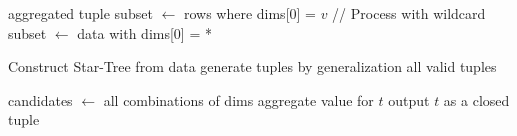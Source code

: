 \usepackage{algorithm}
\usepackage{algpseudocode}
\begin{algorithm}[H]
\caption{BUC (Bottom-Up Computation)}
\begin{algorithmic}[1]
        \State \Return aggregated tuple
    \EndIf
        \State subset $\gets$ rows where dims[0] = $v$
        \State {}
    \EndFor
    \State // Process with wildcard
    \State subset $\gets$ data with dims[0] = *
    \State {}
\EndFunction
\end{algorithmic}
\end{algorithm}
\begin{algorithm}[H]
\caption{Star-Cubing}
\begin{algorithmic}[1]
    \State Construct Star-Tree from data
                \State generate tuples by generalization
            \EndIf
        \EndFor
    \EndFor
    \State \Return all valid tuples
\EndFunction
\end{algorithmic}
\end{algorithm}
\begin{algorithm}[H]
\caption{ClosetCube (Cube Fermé)}
\begin{algorithmic}[1]
    \State candidates $\gets$ all combinations of dims
        \State aggregate value for $t$
            \State output $t$ as a closed tuple
        \EndIf
    \EndFor
\EndFunction
\end{algorithmic}
\end{algorithm}